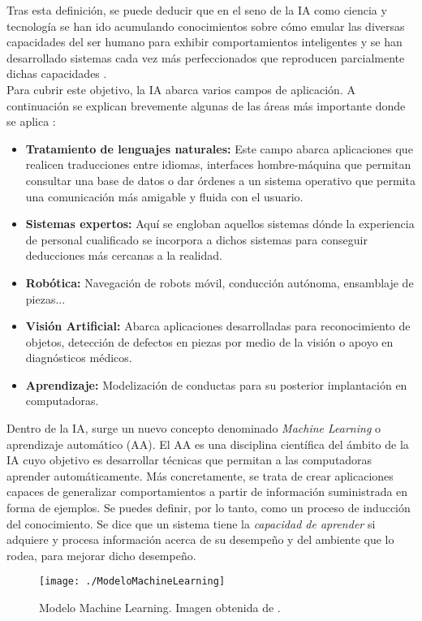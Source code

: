 \documentclass[a4paper, 12pt, oneside]{book}
\begin{document}
Tras esta definición, se puede deducir que en el seno de la IA como ciencia y tecnología se han ido acumulando conocimientos sobre cómo emular las diversas capacidades del ser humano para exhibir comportamientos inteligentes y se han desarrollado sistemas cada vez más perfeccionados que reproducen parcialmente dichas capacidades \cite{IA}.\\

Para cubrir este objetivo, la IA abarca varios campos de aplicación. A continuación se explican brevemente algunas de las áreas más importante donde se aplica \cite{IA_2}:
\begin{itemize}
\item \textbf{Tratamiento de lenguajes naturales:} Este campo abarca aplicaciones que realicen traducciones entre idiomas, interfaces hombre-máquina que permitan consultar una base de datos o dar órdenes a un sistema operativo que permita una comunicación más amigable y fluida con el usuario.
\item \textbf{Sistemas expertos:} Aquí se engloban aquellos sistemas dónde la experiencia de personal cualificado se incorpora a dichos sistemas para conseguir deducciones más cercanas a la realidad.
\item \textbf{Robótica:} Navegación de robots móvil, conducción autónoma, ensamblaje de piezas...
\item \textbf{Visión Artificial:} Abarca aplicaciones desarrolladas para reconocimiento de objetos, detección de defectos en piezas por medio de la visión o apoyo en diagnósticos médicos.
\item \textbf{Aprendizaje:} Modelización de conductas para su posterior implantación en computadoras.  
\end{itemize}

Dentro de la IA, surge un nuevo concepto denominado \textit{Machine Learning} o aprendizaje automático (AA). El AA es una disciplina científica del ámbito de la IA cuyo objetivo es desarrollar técnicas que permitan a las computadoras aprender automáticamente. Más concretamente, se trata de crear aplicaciones capaces de generalizar comportamientos a partir de información suministrada en forma de ejemplos. Se puedes definir, por lo tanto, como un proceso de inducción del conocimiento. Se dice que un sistema tiene la \textit{capacidad de aprender} si adquiere y procesa información acerca de su desempeño y del ambiente que lo rodea, para mejorar dicho desempeño.\\

\begin{figure}[H]
\begin{center}
\texttt{[image: ./ModeloMachineLearning]}
\caption{Modelo Machine Learning. Imagen obtenida de \cite{ML}.}
\label{ModeloMachineLearning}
\end{center}
\end{figure}
\end{document}
